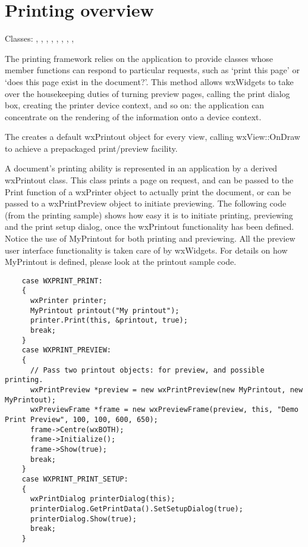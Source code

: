 \section{Printing overview}\label{printingoverview}

Classes: , 
, 
, 
, 
, 
, 
, 
, 

The printing framework relies on the application to provide classes
whose member functions can respond to particular requests, such
as `print this page' or `does this page exist in the document?'.
This method allows wxWidgets to take over the housekeeping duties of
turning preview pages, calling the print dialog box, creating
the printer device context, and so on: the application can concentrate
on the rendering of the information onto a device context.

The  creates a default wxPrintout
object for every view, calling wxView::OnDraw to achieve a
prepackaged print/preview facility.

A document's printing ability is represented in an application by a
derived wxPrintout class. This class prints a page on request, and can
be passed to the Print function of a wxPrinter object to actually print
the document, or can be passed to a wxPrintPreview object to initiate
previewing. The following code (from the printing sample) shows how easy
it is to initiate printing, previewing and the print setup dialog, once the wxPrintout
functionality has been defined. Notice the use of MyPrintout for
both printing and previewing. All the preview user interface functionality
is taken care of by wxWidgets. For details on how MyPrintout is defined,
please look at the printout sample code.

\begin{verbatim}
    case WXPRINT_PRINT:
    {
      wxPrinter printer;
      MyPrintout printout("My printout");
      printer.Print(this, &printout, true);
      break;
    }
    case WXPRINT_PREVIEW:
    {
      // Pass two printout objects: for preview, and possible printing.
      wxPrintPreview *preview = new wxPrintPreview(new MyPrintout, new MyPrintout);
      wxPreviewFrame *frame = new wxPreviewFrame(preview, this, "Demo Print Preview", 100, 100, 600, 650);
      frame->Centre(wxBOTH);
      frame->Initialize();
      frame->Show(true);
      break;
    }
    case WXPRINT_PRINT_SETUP:
    {
      wxPrintDialog printerDialog(this);
      printerDialog.GetPrintData().SetSetupDialog(true);
      printerDialog.Show(true);
      break;
    }
\end{verbatim}

